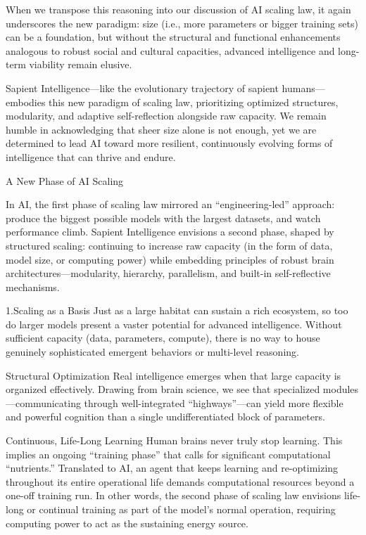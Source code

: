 When we transpose this reasoning into our discussion of AI scaling law, it again underscores the new paradigm: size (i.e., more parameters or bigger training sets) can be a foundation, but without the structural and functional enhancements analogous to robust social and cultural capacities, advanced intelligence and long-term viability remain elusive.

Sapient Intelligence—like the evolutionary trajectory of sapient humans—embodies this new paradigm of scaling law, prioritizing optimized structures, modularity, and adaptive self-reflection alongside raw capacity. We remain humble in acknowledging that sheer size alone is not enough, yet we are determined to lead AI toward more resilient, continuously evolving forms of intelligence that can thrive and endure.

A New Phase of AI Scaling

In AI, the first phase of scaling law mirrored an “engineering-led” approach: produce the biggest possible models with the largest datasets, and watch performance climb. Sapient Intelligence envisions a second phase, shaped by structured scaling: continuing to increase raw capacity (in the form of data, model size, or computing power) while embedding principles of robust brain architectures—modularity, hierarchy, parallelism, and built-in self-reflective mechanisms.

1.Scaling as a Basis
Just as a large habitat can sustain a rich ecosystem, so too do larger models present a vaster potential for advanced intelligence. Without sufficient capacity (data, parameters, compute), there is no way to house genuinely sophisticated emergent behaviors or multi-level reasoning.

Structural Optimization
Real intelligence emerges when that large capacity is organized effectively. Drawing from brain science, we see that specialized modules—communicating through well-integrated “highways”—can yield more flexible and powerful cognition than a single undifferentiated block of parameters.

Continuous, Life-Long Learning
Human brains never truly stop learning. This implies an ongoing “training phase” that calls for significant computational “nutrients.” Translated to AI, an agent that keeps learning and re-optimizing throughout its entire operational life demands computational resources beyond a one-off training run. In other words, the second phase of scaling law envisions life-long or continual training as part of the model’s normal operation, requiring computing power to act as the sustaining energy source.

